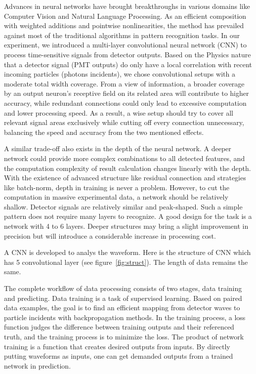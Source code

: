 Advances in neural networks have brought breakthroughs in various domains like Computer Vision and Natural Language Processing. As an efficient composition with weighted additions and pointwise nonlinearities, the method has prevailed against most of the traditional algorithms in pattern recognition tasks. In our experiment, we introduced a multi-layer convolutional neural network (CNN) to process time-sensitive signals from detector outputs. Based on the Physics nature that a detector signal (PMT outputs) do only have a local correlation with recent incoming particles (photons incidents), we chose convolutional setups with a moderate total width coverage. From a view of information, a broader coverage by an output neuron's receptive field on its related area will contribute to higher accuracy, while redundant connections could only lead to excessive computation and lower processing speed. As a result, a wise setup should try to cover all relevant signal areas exclusively while cutting off every connection unnecessary, balancing the speed and accuracy from the two mentioned effects.

A similar trade-off also exists in the depth of the neural network. A deeper network could provide more complex combinations to all detected features, and the computation complexity of result calculation changes linearly with the depth. With the existence of advanced structure like residual connection and strategies like batch-norm, depth in training is never a problem. However, to cut the computation in massive experimental data, a network should be relatively shallow. Detector signals are relatively similar and peak-shaped. Such a simple pattern does not require many layers to recognize. A good design for the task is a network with 4 to 6 layers. Deeper structures may bring a slight improvement in precision but will introduce a considerable increase in processing cost.

A CNN is developed to analys the waveform. Here is the structure of CNN which has 5 convolutional layer (see figure~\ref{fig:struct}). The length of data remains the same. 


The complete workflow of data processing consists of two stages, data training and predicting. Data training is a task of supervised learning.  Based on paired data examples, the goal is to find an efficient mapping from detector waves to particle incidents with backpropagation methods. In the training process, a loss function judges the difference between training outputs and their referenced truth, and the training process is to minimize the loss. The product of network training is a function that creates desired outputs from inputs. By directly putting waveforms as inputs, one can get demanded outputs from a trained network in prediction.

